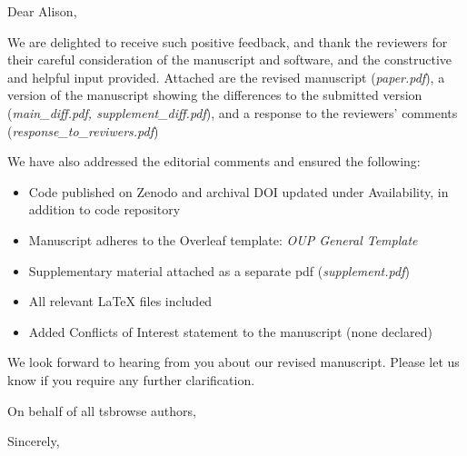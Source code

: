 \documentclass{letter}
\begin{document}
\begin{letter}{}

\opening{Dear Alison,}

We are delighted to receive such positive feedback, and thank the reviewers for their 
careful consideration of the manuscript and software, and the constructive and helpful 
input provided. Attached are the revised manuscript (\textit{paper.pdf}), 
a version of the manuscript showing the differences to the submitted version 
(\textit{main\_diff.pdf, supplement\_diff.pdf}), and a response to the reviewers' comments 
(\textit{response\_to\_reviwers.pdf})

We have also addressed the editorial comments and ensured the following:
\begin{itemize}
    \item Code published on Zenodo and archival DOI updated 
    under Availability, in addition to code repository
    \item Manuscript adheres to the Overleaf template: \textit{OUP General Template}
    \item Supplementary material attached as a separate pdf (\textit{supplement.pdf})
    \item All relevant LaTeX files included
    \item Added Conflicts of Interest statement to the manuscript (none declared)
\end{itemize}

We look forward to hearing from you about our revised manuscript. Please let us know if you require any 
further clarification.

On behalf of all tsbrowse authors,
\closing{Sincerely,}

\end{letter}
\end{document}
